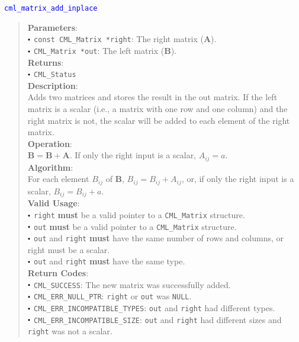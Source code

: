 \documentclass[a4paper,oneside,8pt]{extarticle}
\newcommand{\function}[1]{
  \noindent\textcolor{blue}{\texttt{#1}}
  \vspace{-0.3em}
}
\renewcommand{\dot}{\raisebox{0.3ex}{\scalebox{0.6}{$\bullet$}}}
\theoremstyle{definition}
\begin{document}
\function{cml\_matrix\_add\_inplace}
\begin{quote}
  \textbf{Parameters}: \\
  $\dot$ \texttt{const CML\_Matrix *right}: The right matrix ($\mathbf{A}$). \\
  $\dot$ \texttt{CML\_Matrix *out}: The left matrix ($\mathbf{B}$). \\
  \textbf{Returns}: \\
  $\dot$ \texttt{CML\_Status} \\

  \vspace{-0.75em}
  \textbf{Description}: \\
  Adds two matrices and stores the result in the out matrix. If the left matrix is a scalar (i.e., a matrix with one row and one column) and the right matrix is not, the scalar will be added to each element of the right matrix. \\

  \vspace{-0.75em}
  \textbf{Operation}: \\
  $\mathbf{B} = \mathbf{B} + \mathbf{A}$. If only the right input is a scalar, $A_{ij} = a$. \\

  \vspace{-0.75em}
  \textbf{Algorithm}: \\
  For each element $B_{ij}$ of $\mathbf{B}$, $B_{ij} = B_{ij} + A_{ij}$, or, if only the right input is a scalar, $B_{ij} = B_{ij} + a$. \\

  \vspace{-0.75em}
  \textbf{Valid Usage}: \\
  $\dot$ \texttt{right} \textbf{must} be a valid pointer to a \texttt{CML\_Matrix} structure. \\
  $\dot$ \texttt{out} \textbf{must} be a valid pointer to a \texttt{CML\_Matrix} structure. \\
  $\dot$ \texttt{out} and \texttt{right} \textbf{must} have the same number of rows and columns, or right must be a scalar. \\
  $\dot$ \texttt{out} and \texttt{right} \textbf{must} have the same type. \\

  \vspace{-0.75em}
  \textbf{Return Codes}: \\
  $\dot$ \texttt{CML\_SUCCESS}: The new matrix was successfully added. \\
  $\dot$ \texttt{CML\_ERR\_NULL\_PTR}: \texttt{right} or \texttt{out} was \texttt{NULL}. \\
  $\dot$ \texttt{CML\_ERR\_INCOMPATIBLE\_TYPES}: \texttt{out} and \texttt{right} had different types. \\
  $\dot$ \texttt{CML\_ERR\_INCOMPATIBLE\_SIZE}: \texttt{out} and \texttt{right} had different sizes and \texttt{right} was not a scalar. \\
\end{quote}
\end{document}

